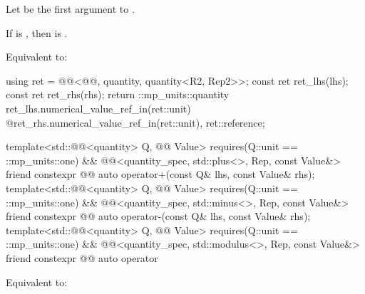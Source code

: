 \begin{itemdescr}
\pnum
Let  be the first argument to .

\pnum
\expects
If  is \tcode{\%}, then  is .

\pnum
\effects
Equivalent to:
\begin{codeblock}
using ret = @@<@@, quantity, quantity<R2, Rep2>>;
const ret ret_lhs(lhs);
const ret ret_rhs(rhs);
return ::mp_units::quantity{
  ret_lhs.numerical_value_ref_in(ret::unit) @\atsign@ ret_rhs.numerical_value_ref_in(ret::unit),
  ret::reference};
\end{codeblock}
\end{itemdescr}

\begin{itemdecl}
template<std::@@<quantity> Q, @@ Value>
  requires(Q::unit == ::mp_units::one) &&
          @@<quantity_spec, std::plus<>, Rep, const Value&>
friend constexpr @@ auto operator+(const Q& lhs, const Value& rhs);
template<std::@@<quantity> Q, @@ Value>
  requires(Q::unit == ::mp_units::one) &&
          @@<quantity_spec, std::minus<>, Rep, const Value&>
friend constexpr @@ auto operator-(const Q& lhs, const Value& rhs);
template<std::@@<quantity> Q, @@ Value>
  requires(Q::unit == ::mp_units::one) &&
          @@<quantity_spec, std::modulus<>, Rep, const Value&>
friend constexpr @@ auto operator%
\end{itemdecl}

\begin{itemdescr}
\pnum
\effects
Equivalent to:
\end{itemdescr}

